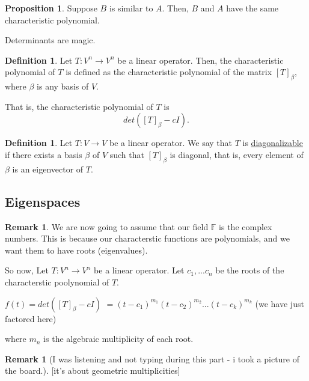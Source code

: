 \documentclass[a5paper]{article}
\makeatletter
\renewenvironment{proof}{{\bfseries Proof}}{\qed}
\renewenvironment{proof}[1][\bfseries \proofname]{\par
  \pushQED{\qed}%
  \normalfont \topsep6\p@\@plus6\p@\relax
  \trivlist
  \item[\hskip\labelsep
        \scshape
    #1\@addpunct{}]\ignorespaces
}{%
  \popQED\endtrivlist\@endpefalse
}
\theoremstyle{definition}%
\numberwithin{theorem}{section} %
\newtheorem{definition}[theorem]{Definition}
\newtheorem{proposition}[theorem]{Proposition}
\newtheorem{remark}[theorem]{Remark}
\newcommand{\F}{\mathbb{F}}
\makeatother
\begin{document}
\begin{proposition}
Suppose $B$ is similar to $A$. Then, $B$ and $A$ have the same characteristic polynomial.
\begin{proof}
Determinants are magic. 
\end{proof}
\end{proposition}

\begin{definition}
Let $T:V^n \to V^n$ be a linear operator.
Then, the characteristic polynomial of $T$ is defined as the characteristic polynomial of the matrix $[T]_{\beta}$, where $\beta$ is any basis of $V$. 

That is, the characteristic polynomial of $T$ is 
$$det([T]_{\beta}-cI).$$
\end{definition}

\begin{definition}
Let $T:V \to V$ be a linear operator. We say that $T$ is \underline{diagonalizable} if there exists a basis $\beta$ of $V$ such that $[T]_{\beta}$ is diagonal, that is, every element of $\beta$ is an eigenvector of $T$. 
\end{definition}

\subsection{Eigenspaces}

\begin{remark}
We are now going to assume that our field $\F$ is the complex numbers. This is because our characterstic functions are polynomials, and we want them to have roots (eigenvalues). 

So now, Let $T:V^n \to V^n$ be a linear operator. Let $c_1, ... c_n$ be the roots of the characterstic poolynomial of $T$. 

$f(t) = det([T]_{\beta}-cI)$
$= (t-c_1)^{m_1}(t-c_2)^{m_2} ... (t-c_k)^{m_k}$ (we have just factored here)

where ${m_n}$ is the algebraic multiplicity of each root. 
\end{remark}

\begin{remark}
[I was listening and not typing during this part - i took a picture of the board.] [it's about geometric multiplicities]
\end{remark}
\end{document}
